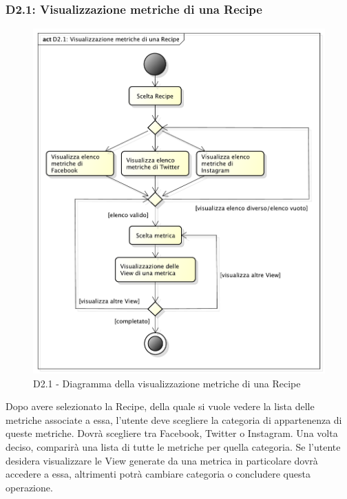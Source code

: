 		\subsubsection{D2.1: Visualizzazione metriche di una Recipe} %
		\label{ssub:visualizzazione_metriche_di_una_recipe}
		\label{ssub:registrazione_al_sistema}
		\begin{figure}[!htbp]
			\centering
			\centerline{\includegraphics[scale=0.45]{./images/D2_1.pdf}}
			\caption{D2.1 - Diagramma della visualizzazione metriche di una Recipe}
		\end{figure}
		\noindent
		Dopo avere selezionato la Recipe, della quale si vuole vedere la lista delle metriche associate a essa, l'utente deve scegliere la categoria di appartenenza di queste metriche. Dovrà scegliere tra Facebook, Twitter o Instagram. Una volta deciso, comparirà una lista di tutte le metriche per quella categoria. Se l'utente desidera visualizzare le View generate da una metrica in particolare dovrà accedere a essa, altrimenti potrà cambiare categoria o concludere questa operazione.


